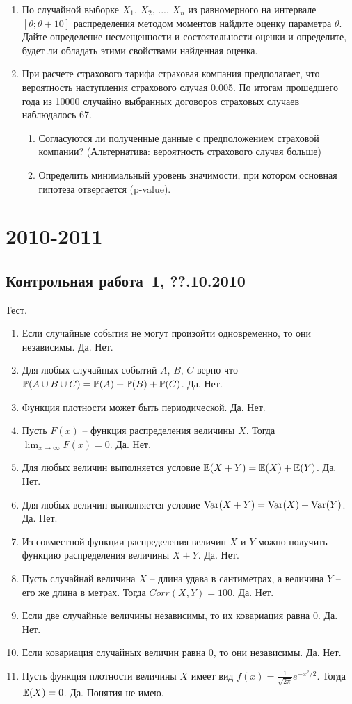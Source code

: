 \documentclass[pdftex,12pt,a4paper]{article}
\begin{document}
\begin{enumerate}
\item По случайной выборке $X_1$, $X_2$, ..., $X_n$ из равномерного на интервале $[\theta;\theta+10]$ распределения методом моментов найдите оценку параметра $\theta$. Дайте определение несмещенности и состоятельности оценки и определите, будет ли обладать этими свойствами найденная оценка.

\item При расчете страхового тарифа страховая компания предполагает, что вероятность наступления страхового случая 0.005. По итогам прошедшего года из 10000 случайно выбранных договоров страховых случаев наблюдалось 67. 
\begin{enumerate}
\item Согласуются ли полученные данные с предположением страховой компании? (Альтернатива: вероятность страхового случая больше)
\item Определить минимальный уровень значимости, при котором основная гипотеза отвергается (p-value).
\end{enumerate}
\end{enumerate}


\section{2010-2011}


\subsection{Контрольная работа \No\,1, ??.10.2010}

Тест.

\begin{enumerate}
\item Если случайные события не могут произойти одновременно, то они независимы. Да. Нет.
\item  Для любых случайных событий $A$, $B$, $C$ верно что $\P(A\cup B\cup C)=\P(A)+\P(B)+\P(C)$. Да. Нет. 
\item  Функция плотности может быть периодической. Да. Нет.
\item  Пусть $F(x)$ -- функция распределения величины $X$. Тогда $\lim_{x\to\infty} F(x)=0$. Да. Нет.
\item  Для любых величин выполняется условие $\E(X+Y)=\E(X)+\E(Y)$. Да. Нет.
\item  Для любых величин выполняется условие $\Var(X+Y)=\Var(X)+\Var(Y)$. Да. Нет.
\item  Из совместной функции распределения величин $X$ и $Y$ можно получить функцию распределения величины $X+Y$. Да. Нет.
\item  Пусть случайнай величина $X$ -- длина удава в сантиметрах, а величина $Y$ -- его же длина в метрах. Тогда $Corr(X,Y)=100$. Да. Нет.
\item  Если две случайные величины независимы, то их ковариация равна 0. Да. Нет.
\item  Если ковариация случайных величин равна 0, то они независимы. Да. Нет.
\item  Пусть функция плотности величины $X$ имеет вид  $f(x)=\frac{1}{\sqrt{2\pi}}e^{-x^2/2}$. Тогда $\E(X)=0$. Да. Понятия не имею.
\end{enumerate}
\end{document}
